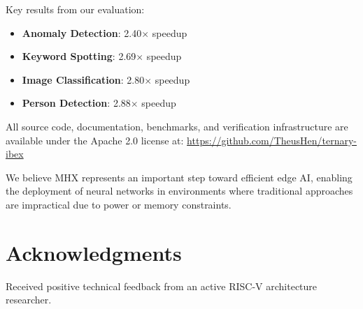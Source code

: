 \documentclass[conference,10pt]{IEEEtran}
\newcommand{\mhx}{\textsc{MHX\texttrademark}}
\begin{document}
Key results from our evaluation:
\begin{itemize}
    \item \textbf{Anomaly Detection}: 2.40$\times$ speedup
    \item \textbf{Keyword Spotting}: 2.69$\times$ speedup
    \item \textbf{Image Classification}: 2.80$\times$ speedup
    \item \textbf{Person Detection}: 2.88$\times$ speedup
\end{itemize}

All source code, documentation, benchmarks, and verification infrastructure are available under the Apache 2.0 license at: \url{https://github.com/TheusHen/ternary-ibex}

We believe \mhx{} represents an important step toward efficient edge AI, enabling the deployment of neural networks in environments where traditional approaches are impractical due to power or memory constraints.

\section*{Acknowledgments}

Received positive technical feedback from an active RISC-V architecture researcher.

\end{document}
